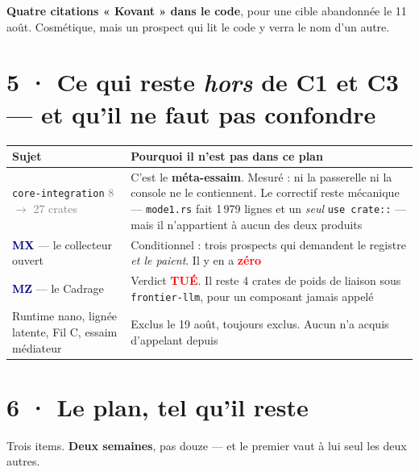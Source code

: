 \documentclass[10pt]{article}
\newcommand{\pire}[1]{\textcolor{red}{\textbf{#1}}}
\newcommand{\sz}[1]{\textcolor{grey}{\small\textsf{#1}}}
\newcommand{\code}[1]{\texttt{\small #1}}
\newcommand{\fl}{$\rightarrow$}
\newcommand{\mm}[1]{\textbf{\textcolor{navy}{#1}}}
\begin{document}
\textbf{Quatre citations « Kovant » dans le code}, pour une cible abandonnée le 11 août. Cosmétique,
mais un prospect qui lit le code y verra le nom d'un autre.

\section{5 · Ce qui reste \emph{hors} de C1 et C3 --- et qu'il ne faut pas confondre}

\begin{center}\small
\renewcommand{\arraystretch}{1.24}
\begin{tabular}{@{}>{\raggedright\arraybackslash}p{4.2cm} >{\raggedright\arraybackslash}p{11.3cm}@{}}
\toprule
\textbf{Sujet} & \textbf{Pourquoi il n'est pas dans ce plan} \\
\midrule
\code{core-integration} \sz{8 \fl{} 27 crates} & C'est le \textbf{méta-essaim}. Mesuré : ni la passerelle ni la console ne le contiennent. Le correctif reste mécanique --- \code{mode1.rs} fait 1\,979 lignes et un \emph{seul} \code{use crate::} --- mais il n'appartient à aucun des deux produits \\
\mm{MX} --- le collecteur ouvert & Conditionnel : trois prospects qui demandent le registre \emph{et le paient}. Il y en a \pire{zéro} \\
\mm{MZ} --- le Cadrage & Verdict \pire{TUÉ}. Il reste 4 crates de poids de liaison sous \code{frontier-llm}, pour un composant jamais appelé \\
Runtime nano, lignée latente, Fil C, essaim médiateur & Exclus le 19 août, toujours exclus. Aucun n'a acquis d'appelant depuis \\
\bottomrule
\end{tabular}
\end{center}

\section{6 · Le plan, tel qu'il reste}

Trois items. \textbf{Deux semaines}, pas douze --- et le premier vaut à lui seul les deux autres.
\end{document}
